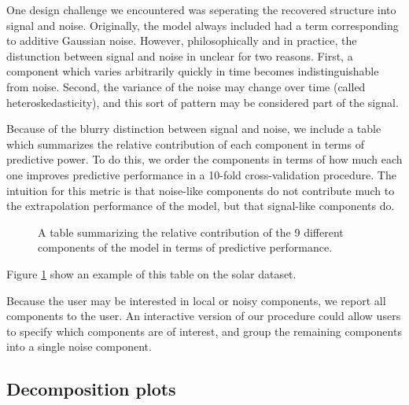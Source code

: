 \documentclass{article} %
\begin{document}
One design challenge we encountered was seperating the recovered structure into signal and noise.  Originally, the model always included had a term corresponding to \iid{} additive Gaussian noise.  However, philosophically and in practice, the distunction between signal and noise in unclear for two reasons.  First, a component which varies arbitrarily quickly in time becomes indistinguishable from noise.  Second, the variance of the noise may change over time (called heteroskedasticity), and this sort of pattern may be considered part of the signal.

Because of the blurry distinction between signal and noise, we include a table which summarizes the relative contribution of each component in terms of predictive power.  To do this, we order the components in terms of how much each one improves predictive performance in a 10-fold cross-validation procedure.  The intuition for this metric is that noise-like components do not contribute much to the extrapolation performance of the model, but that signal-like components do.
%
%
\begin{figure}
\centering
{}
\caption{A table summarizing the relative contribution of the 9 different components of the model in terms of predictive performance.}
\label{fig:table}
\end{figure}
%
Figure \ref{fig:table} show an example of this table on the solar dataset.

Because the user may be interested in local or noisy components, we report all components to the user.  An interactive version of our procedure could allow users to specify which components are of interest, and group the remaining components into a single noise component.


\subsection{Decomposition plots}
\end{document}

